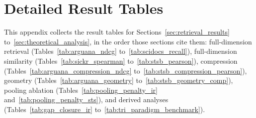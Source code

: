 \section{Detailed Result Tables}
\label{app:app2}
\setcounter{table}{0}
\renewcommand{\thetable}{A\arabic{table}}

This appendix collects the result tables for Sections~\ref{sec:retrieval_results} to~\ref{sec:theoretical_analysis}, in the order those sections cite them: full-dimension retrieval (Tables~\ref{tab:arguana_ndcg} to~\ref{tab:scidocs_recall}), full-dimension similarity (Tables~\ref{tab:sickr_spearman} to~\ref{tab:stsb_pearson}), compression (Tables~\ref{tab:arguana_compression_ndcg} to~\ref{tab:stsb_compression_pearson}), geometry (Tables~\ref{tab:arguana_geometry} to~\ref{tab:stsb_geometry_comp}), pooling ablation (Tables~\ref{tab:pooling_penalty_ir} and~\ref{tab:pooling_penalty_sts}), and derived analyses (Tables~\ref{tab:gap_closure_ir} to~\ref{tab:tri_paradigm_benchmark}).


















\clearpage


